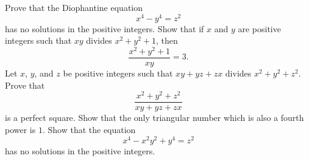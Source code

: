 \begin{challenge}
  \exercise Prove that the Diophantine equation
  \begin{equation*}
    x^4-y^4=z^2
  \end{equation*}
  has no solutions in the positive integers.
  \exercise Show that if $x$ and $y$ are positive integers such that $xy$ divides $x^2+y^2+1$, then
  \begin{equation*}
    \frac{x^2+y^2+1}{xy}=3.
  \end{equation*}
  \exercise Let $x$, $y$, and $z$ be positive integers such that $xy+yz+zx$ divides $x^2+y^2+z^2$. Prove that
  \begin{equation*}
    \frac{x^2+y^2+z^2}{xy+yz+zx}
  \end{equation*}
  is a perfect square.
  \exercise Show that the only triangular number which is also a fourth power is $1$.
  \exercise Show that the equation
  \begin{equation*}
    x^4-x^2y^2+y^4=z^2
  \end{equation*}
  has no solutions in the positive integers.
\end{challenge}

